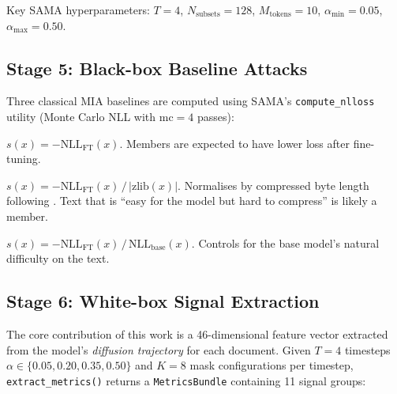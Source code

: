 \documentclass[11pt,a4paper]{article}
\begin{document}
Key SAMA hyperparameters: $T=4$, $N_{\text{subsets}}=128$,
$M_{\text{tokens}}=10$, $\alpha_{\min}=0.05$, $\alpha_{\max}=0.50$.

\subsection{Stage 5: Black-box Baseline Attacks}
\label{sec:attacks}

Three classical MIA baselines are computed using SAMA's
\texttt{compute\_nlloss} utility (Monte Carlo NLL with $\text{mc}=4$ passes):

\begin{description}[nosep]
  \item[\textbf{Loss}] $s(x) = -\text{NLL}_{\text{FT}}(x)$. Members are
    expected to have lower loss after fine-tuning.
  \item[\textbf{Zlib}] $s(x) = -\text{NLL}_{\text{FT}}(x) \,/\, |\text{zlib}(x)|$.
    Normalises by compressed byte length following \citet{carlini2021extracting}.
    Text that is ``easy for the model but hard to compress'' is likely a member.
  \item[\textbf{Ratio}] $s(x) = -\text{NLL}_{\text{FT}}(x) \,/\,
    \text{NLL}_{\text{base}}(x)$. Controls for the base model's natural
    difficulty on the text.
\end{description}

\subsection{Stage 6: White-box Signal Extraction}
\label{sec:signals}

The core contribution of this work is a 46-dimensional feature vector
extracted from the model's \emph{diffusion trajectory} for each document.
Given $T=4$ timesteps $\alpha \in \{0.05, 0.20, 0.35, 0.50\}$ and
$K=8$ mask configurations per timestep, \texttt{extract\_metrics()} returns
a \texttt{MetricsBundle} containing 11 signal groups:
\end{document}
